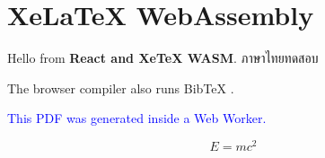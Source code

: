 \documentclass[a4paper,12pt]{article}
\begin{document}
\section*{XeLaTeX WebAssembly}

Hello from \textbf{React and XeTeX WASM}. ภาษาไทยทดสอบ

The browser compiler also runs BibTeX \cite{knuth1984}.

\textcolor{blue}{This PDF was generated inside a Web Worker.}

\[
E = mc^2
\]



\end{document}
